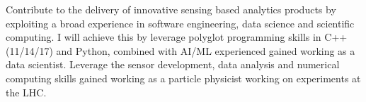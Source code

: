 

\begin{cvparagraph}


Contribute to the delivery of innovative sensing based analytics products by 
exploiting a broad experience in software engineering, data science and 
scientific computing. I will achieve this by leverage polyglot programming skills 
in C++(11/14/17) and Python, combined with AI/ML experienced gained working as a data 
scientist. Leverage the
sensor development, data analysis and numerical computing skills gained working as a particle physicist 
working on experiments at the LHC.

\end{cvparagraph}